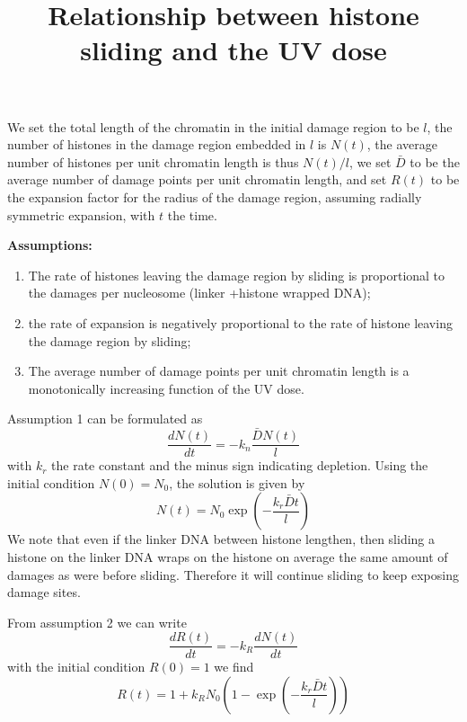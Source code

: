 \documentclass[12pt]{report}
\begin{document}
	
\title{Relationship between histone sliding and the UV dose}
\maketitle

We set the total length of the chromatin in the initial damage region to be $l$, the number of histones in the damage region embedded in $l$ is $N(t)$, the average number of histones per unit chromatin length is thus $N(t)/l$, we set $\bar{D}$ to be the average number of damage points per unit chromatin length, and set $R(t)$ to be the expansion factor for the radius of the damage region, assuming radially symmetric expansion, with $t$ the time. 

\textbf{Assumptions:} 
\begin{enumerate}
	\item The rate of histones leaving the damage region by sliding is proportional to the damages per nucleosome (linker +histone wrapped DNA);
	\item the rate of expansion is negatively proportional to the rate of histone leaving the damage region by sliding;
	\item The average number of damage points per unit chromatin length is a monotonically increasing function of the UV dose. 
\end{enumerate}

Assumption 1 can be formulated as 
\begin{equation}
\frac{dN(t)}{dt} = -k_n\frac{\bar{D}N(t)}{l}
\end{equation}
with $k_r$ the rate constant and the minus sign indicating depletion. Using the initial condition $N(0) = N_0$, the solution is given by 
\begin{equation}
N(t) = N_0\exp(-\frac{k_r\bar{D}t}{l})
\end{equation}
We note that even if the linker DNA between histone lengthen, then sliding a histone on the linker DNA wraps on the histone on average the same amount of damages as were before sliding. Therefore it will continue sliding to keep exposing damage sites.

From assumption 2 we can write 
\begin{equation}
\frac{dR(t)}{dt}=-k_R\frac{dN(t)}{dt}
\end{equation}
with the initial condition $R(0)=1$ we find 
\begin{equation}\label{eq:expansionFactor}
R(t) = 1+k_RN_0(1-\exp(-\frac{k_r\bar{D}t}{l}))
\end{equation}
\end{document}
